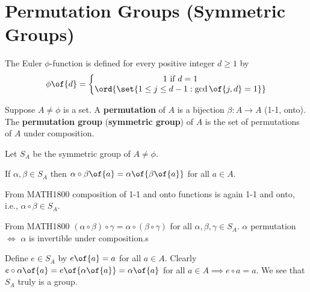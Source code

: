 \chapter{Permutation Groups (Symmetric Groups)}


\begin{definition}
    The Euler $\phi$-function is defined for every positive integer $d \geq 1$ by
    \[\phi\of{d} = \left\{ \begin{matrix} 1 \text{ if } d = 1 \\ \ord{\set{1 \leq j \leq d - 1: \gcd\of{j,d} = 1}} \end{matrix} \right.\]
\end{definition}

\begin{definition}
    Suppose $A \neq \phi$ is a set. A \textbf{permutation} of $A$ is a bijection $\beta: A \to A$ (1-1, onto). The \textbf{permutation group} (\textbf{symmetric group}) of $A$ is the set of permutations of $A$ under composition.
\end{definition}

\begin{recall}
    Let $S_A$ be the symmetric group of $A \neq \phi$.

    If $\alpha, \beta \in S_A$ then $\alpha \circ \beta \of{a} = \alpha\of{\beta\of{a}}$ for all $a \in A$.

    From MATH1800 composition of 1-1 and onto functions is again 1-1 and onto, i.e., $\alpha \circ \beta \in S_A$.

    From MATH1800 $(\alpha \circ \beta) \circ \gamma = \alpha \circ (\beta \circ \gamma)$ for all $\alpha, \beta, \gamma \in S_A$.
    $\alpha$ permutation $\iff$ $\alpha$ is invertible under composition.s
\end{recall}

\begin{remark}
    Define $e \in S_A$ by $e\of{a} = a$ for all $a \in A$. Clearly $e \circ \alpha \of{a} = e\of{\alpha\of{a}} = \alpha\of{a}$ for all $a \in A \implies e \circ a = a$.
    We see that $S_A$ truly is a group.
\end{remark}

